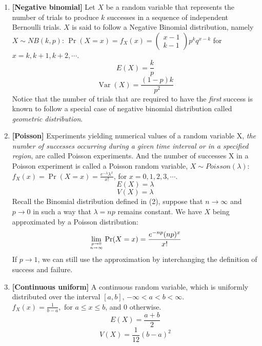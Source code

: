 \documentclass[a4paper]{article}
\begin{document}
\begin{enumerate}
\item
\textbf{[Negative binomial]}
Let $X$ be a random variable that represents the number of trials to produce $k$ successes in a sequence of independent Bernoulli trials. $X$ is said to follow a Negative Binomial distribution, namely $X \sim NB(k, p)$: $\operatorname{Pr}(X=x)=f_{X}(x)=\left( \begin{array}{c}{x-1} \\ {k-1}\end{array}\right) p^{k} q^{x-k}$ for $x=k, k+1, k+2, \cdots$.
\begin{equation}
E(X)=\frac{k}{p}
\end{equation}
\begin{equation}
\operatorname{Var}(X)=\frac{(1-p) k}{p^{2}}
\end{equation}
Notice that the number of trials that are required to have the \textit{first} success is known to follow a special case of negative binomial distribution called \textit{geometric distribution}.

\item
\textbf{[Poisson]}
Experiments yielding numerical values of a random variable X, \textit{the number of successes occurring during a given time interval or in a specified region}, are called Poisson experiments. And the number of successes X in a Poisson experiment is called a Poisson random variable, $X \sim Poisson(\lambda)$: $f_{X}(x)=\operatorname{Pr}(X=x)=\frac{e^{-\lambda} \lambda^{x}}{x !}$, for $x=0,1,2,3, \cdots$.
\begin{equation}
E(X)=\lambda
\end{equation}
\begin{equation}
V(X)=\lambda
\end{equation}
Recall the Binomial distribution defined in (2), suppose that $n \rightarrow \infty$ and $p \rightarrow 0$ in such a way that $\lambda=n p$ remains constant. We have $X$ being approximated by a Poisson distribution:
\[ \lim _{p \rightarrow 0 \atop n \rightarrow \infty} \operatorname{Pr}(X=x)=\frac{e^{-n p}(n p)^{x}}{x !}\]
If $p \rightarrow 1$, we can still use the approximation by interchanging the definition of success and failure.

\newpage

\item
\textbf{[Continuous uniform]}
A continuous random variable, which is uniformly distributed over the interval $[a, b]$, $-\infty<a<b<\infty$. $f_{X}(x)=\frac{1}{b-a}, \text { for } a \leq x \leq b$, and 0 otherwise.
\begin{equation}
E(X)=\frac{a+b}{2}
\end{equation}
\begin{equation}
V(X)=\frac{1}{12}(b-a)^{2}
\end{equation}


\end{enumerate}
\end{document}
